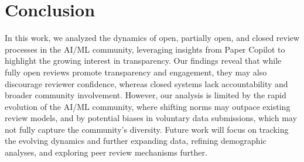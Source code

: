 \section{Conclusion}


In this work, we analyzed the dynamics of open, partially open, and closed review processes in the AI/ML community, leveraging insights from Paper Copilot to highlight the growing interest in transparency. Our findings reveal that while fully open reviews promote transparency and engagement, they may also discourage reviewer confidence, whereas closed systems lack accountability and broader community involvement. However, our analysis is limited by the rapid evolution of the AI/ML community, where shifting norms may outpace existing review models, and by potential biases in voluntary data submissions, which may not fully capture the community's diversity. Future work will focus on tracking the evolving dynamics and further expanding data, refining demographic analyses, and exploring peer review mechanisms further.


